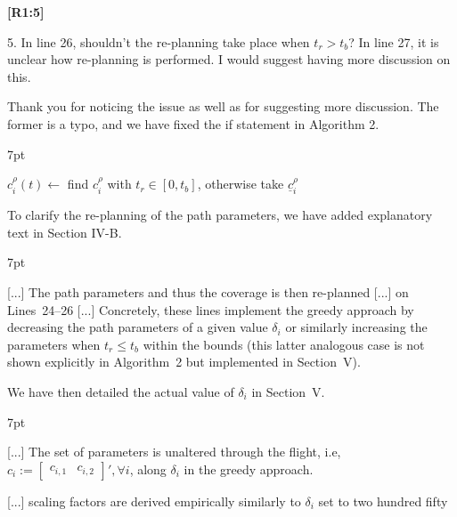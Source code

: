 \documentclass[10pt]{letter}
\newenvironment{formal}{%
  \def\FrameCommand{%
    \hspace{1pt}%
    {\color{red}\vrule width 2pt}%
    {\color{formalshade}\vrule width 4pt}%
    \colorbox{formalshade}%
  }%
  \MakeFramed{\advance\hsize-\width\FrameRestore}%
  \noindent\hspace{-4.55pt}%
  \begin{adjustwidth}{}{7pt}%
  \vspace{2pt}\vspace{2pt}%
}
{%
  \vspace{2pt}\end{adjustwidth}\endMakeFramed%
}
\begin{document}
{\hspace*{-4.5em}\textbf{[R1:5]}\vspace*{-1.9em}}

5. In line 26, shouldn’t the re-planning take place when $t_r>t_b$? In line 27, it is unclear how
re-planning is performed. I would suggest having more discussion on this.

{\hspace*{-4.5em}{[R1:5]}\vspace*{-1.9em}}

{\color{blue} 

{\hspace*{-4.5em}{[R1:5]}\vspace*{-1.9em}}

Thank you for noticing the issue as well as for suggesting more discussion. The former is a typo, and we have fixed the if statement in Algorithm 2.

\begin{formal}
  \begin{algorithmic}[1]
    \small
      \makeatletter
      \setcounter{ALC@line}{24}
      \makeatother
        \color{blue}\STATE $c_i^{\rho}(t)\gets${ find }$c_i^{\rho}${ with }$t_r\in[0,t_b]${, otherwise take }$\underline{c}_i^\rho$\vspace*{.3ex}\label{alg:traj2}
      \color{black}\ENDIF
      \vspace*{.8ex}
    \end{algorithmic}
  \end{formal}  

  To clarify the re-planning of the path parameters, we have added explanatory text in Section IV-B.

  \begin{formal}
    \color{black} [...] The {\color{blue}path parameters and thus the} coverage is then re{\color{blue}-}planned [...] on Lines~{\color{red}24}--{\color{red}26} [...] {\color{blue}Concretely, these lines implement the greedy approach by decreasing the path parameters of a given value $\delta_i$ or similarly increasing the parameters when $t_r\leq t_b$ within the bounds (this latter analogous case is not shown explicitly in Algorithm~{\color{red}2} but implemented in Section~{\color{red}V})}.
    \vspace*{1ex}
  \end{formal}

  We have then detailed the actual value of $\delta_i$ in Section~V.

  \begin{formal}
    \color{black} [...] The set of parameters is unaltered through the flight, i.e, $c_i:=\begin{bmatrix}c_{i,1}&c_{i,2}\end{bmatrix}',\forall i${\color{blue}, along $\delta_i$ %
    in the greedy approach}.
    
    [...] scaling factors are derived empirically %
    {\color{blue}similarly to $\delta_i$ set to two hundred fifty}
    \vspace*{1ex}
  \end{formal}
}
\end{document}
